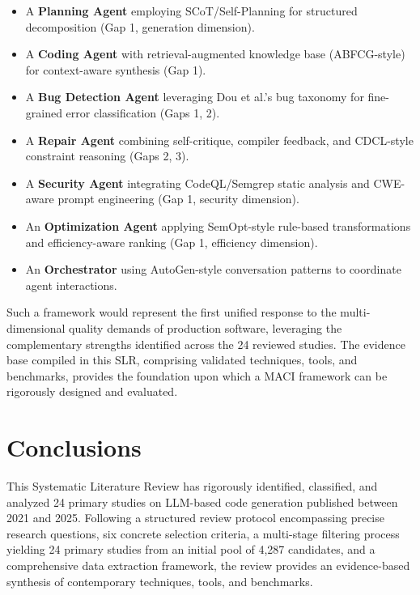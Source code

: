 \documentclass[11pt,a4paper]{article}
\begin{document}
\begin{itemize}[leftmargin=*]
\item A \textbf{Planning Agent} employing SCoT/Self-Planning for structured decomposition (Gap 1, generation dimension).
\item A \textbf{Coding Agent} with retrieval-augmented knowledge base (ABFCG-style) for context-aware synthesis (Gap 1).
\item A \textbf{Bug Detection Agent} leveraging Dou et al.'s bug taxonomy for fine-grained error classification (Gaps 1, 2).
\item A \textbf{Repair Agent} combining self-critique, compiler feedback, and CDCL-style constraint reasoning (Gaps 2, 3).
\item A \textbf{Security Agent} integrating CodeQL/Semgrep static analysis and CWE-aware prompt engineering (Gap 1, security dimension).
\item An \textbf{Optimization Agent} applying SemOpt-style rule-based transformations and efficiency-aware ranking (Gap 1, efficiency dimension).
\item An \textbf{Orchestrator} using AutoGen-style conversation patterns to coordinate agent interactions.
\end{itemize}

Such a framework would represent the first unified response to the multi-dimensional quality demands of production software, leveraging the complementary strengths identified across the 24 reviewed studies. The evidence base compiled in this SLR, comprising validated techniques, tools, and benchmarks, provides the foundation upon which a MACI framework can be rigorously designed and evaluated.

\section{Conclusions}
\label{sec:summary}

This Systematic Literature Review has rigorously identified, classified, and analyzed 24 primary studies on LLM-based code generation published between 2021 and 2025. Following a structured review protocol encompassing precise research questions, six concrete selection criteria, a multi-stage filtering process yielding 24 primary studies from an initial pool of 4{,}287 candidates, and a comprehensive data extraction framework, the review provides an evidence-based synthesis of contemporary techniques, tools, and benchmarks.
\end{document}
